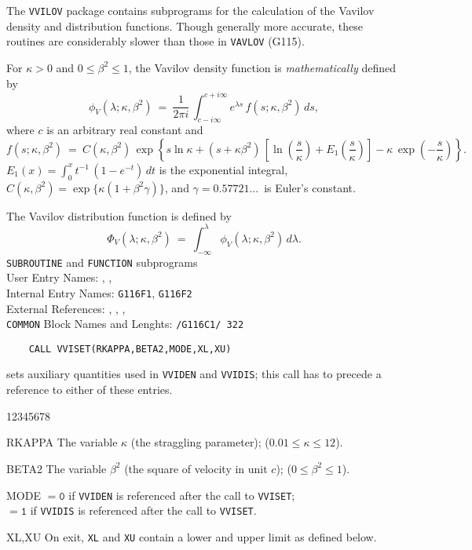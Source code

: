                
             
              
The {\tt VVILOV} package contains subprograms for the calculation of
the Vavilov density and distribution functions. Though generally more
accurate, these routines are considerably slower than those in
{\tt VAVLOV} (G115).
\par
For $\kappa>0$ and $0 \le \beta^2 \le 1$,
the Vavilov density function is {\it mathematically} defined by
$$ \phi_V(\lambda;\kappa,\beta^2) \ = \ \displaystyle \frac{1}{2\pi i}\,
\int_{c-i\infty}^{c+i\infty} e^{\lambda s}\,f(s;\kappa,\beta^2)\,ds,$$
where $c$ is an arbitrary real constant and
$$ f(s;\kappa,\beta^2) \ = \ \displaystyle
C(\kappa,\beta^2)\,\exp \left\{s \ln \kappa + (s+\kappa \beta^2)\,
\left[ \ln \left(\frac{s}{\kappa}\right)
+E_1\left(\frac{s}{\kappa}\right) \right]
-\kappa\,\exp \left(-\frac{s}{\kappa}\right) \right\}. $$
$ E_1(x)=\int_0^x t^{-1}\,(1-e^{-t})\,dt$ is the exponential integral,
$C(\kappa,\beta^2)=\exp\{\kappa(1+\beta^2 \gamma)\}$,
and $\gamma=0.57721\dots\,$ is Euler's constant.
\par
The Vavilov distribution function is defined by
$$ \Phi_V(\lambda;\kappa,\beta^2) \ = \ \displaystyle
\int_{-\infty}^\lambda \phi_V(\lambda;\kappa,\beta^2)\,d\lambda.$$
\Structure
{\tt SUBROUTINE} and {\tt FUNCTION} subprograms \\
User Entry Names: , ,  \\
Internal Entry Names:  {\tt G116F1}, {\tt G116F2} \\
External References: ,
                     , ,
                      \\
{\tt COMMON} Block Names and Lenghts: {\tt /G116C1/ 322}
\Usage
\begin{verbatim}
    CALL VVISET(RKAPPA,BETA2,MODE,XL,XU)
\end{verbatim}
sets auxiliary quantities used in {\tt VVIDEN} and {\tt VVIDIS};
this call has to precede a reference to either of these entries.
\begin{DLtt}{12345678}
\item[RKAPPA] The variable $\kappa$ (the straggling parameter);
($0.01 \le \kappa \le 12$).
\item[BETA2] The variable $\beta^2$ (the square of velocity in unit $c$);
($0 \le \beta^2 \le 1$).
\item[MODE]
$\mathtt{= 0}$ if {\tt VVIDEN} is referenced after the call to
{\tt VVISET}; \\
$\mathtt{= 1}$ if {\tt VVIDIS} is referenced after the call to
{\tt VVISET}.
\item[XL,XU] On exit, {\tt XL} and {\tt XU} contain a lower and
upper limit as defined below.
\end{DLtt}

